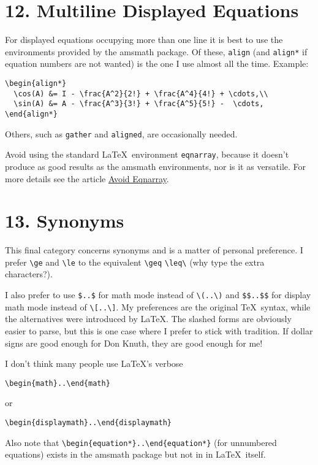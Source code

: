 \documentclass[12pt]{extarticle}
\begin{document}
\section*{12. Multiline Displayed Equations}
\label{sec-13}
For displayed equations occupying more than one line it is best to use the
environments provided by the amsmath package.
Of these, \texttt{align} (and \texttt{align*} if equation numbers are not wanted)
is the one I use almost all the time.
Example:
\begin{verbatim}
\begin{align*}
  \cos(A) &= I - \frac{A^2}{2!} + \frac{A^4}{4!} + \cdots,\\
  \sin(A) &= A - \frac{A^3}{3!} + \frac{A^5}{5!} -  \cdots,
\end{align*}
\end{verbatim}
Others, such as \texttt{gather} and \texttt{aligned}, are occasionally needed.

Avoid using the standard \LaTeX\ environment 
\texttt{eqnarray}, because it 
doesn't produce as good results as the amsmath environments,
nor is it as versatile.
For more details see the article \href{http://tug.org/pracjourn/2006-4/madsen}{Avoid Eqnarray}.

\section*{13. Synonyms}
\label{sec-14}
This final category concerns synonyms and is a matter of personal
preference.
I prefer \texttt{\textbackslash{}ge} and \texttt{\textbackslash{}le} to the equivalent \texttt{\textbackslash{}geq} \texttt{\textbackslash{}leq\textbackslash{}}
(why type the extra characters?).


I also prefer to use \texttt{\$..\$} for math mode instead of \texttt{\textbackslash{}(..\textbackslash{})} and 
                     \texttt{\$\$..\$\$} for display math mode instead of \texttt{\textbackslash{}[..\textbackslash{}]}.
My preferences are the original \TeX\ syntax, while the alternatives were
introduced by \LaTeX.
The slashed forms are obviously easier to parse, but this is
one case where I prefer to stick with tradition.
If dollar signs are good enough for Don Knuth, they are good enough for me!

I don't think many people use \LaTeX's verbose
\begin{verbatim}
\begin{math}..\end{math}
\end{verbatim}
or
\begin{verbatim}
\begin{displaymath}..\end{displaymath}
\end{verbatim}
Also note that 
\texttt{\textbackslash{}begin\{equation*\}..\textbackslash{}end\{equation*\}} 
(for unnumbered equations) exists in the amsmath package
but not in in \LaTeX\ itself.
\end{document}
